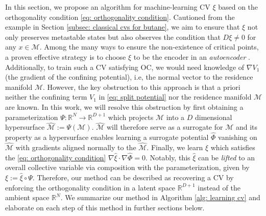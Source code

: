 \documentclass[reqno, 12pt]{article}
\begin{document}
 In this section, we propose an algorithm for machine-learning CV $\xi$ based on the orthogonality condition \eqref{eq: orthogonality condition}. Cautioned from the example in Section \eqref{subsec: classical cvs for butane}, we aim to ensure that $\xi$ not only preserves metastable states but also observes the condition that $D\xi \neq 0$ for any $x \in \mathcal{M}$. Among the many ways to ensure the non-existence of critical points, a proven effective strategy is to choose $\xi$ to be the encoder in an \emph{autoencoder} \cite{belkacemi2023autoencoders}. Additionally, to train such a CV satisfying OC, we would need knowledge of $\nabla V_1$ (the gradient of the confining potential), i.e, the normal vector to the residence manifold $\mathcal{M}$. However, the key obstruction to this approach is that a priori neither the confining term $V_1$ in \eqref{eq: split potential} nor the residence manifold $\mathcal{M}$ are known. In this work, we will resolve this obstruction by first obtaining a parameterization $\Psi: \mathbb{R}^{N} \to \mathbb{R}^{D+1}$ which projects $\mathcal{M}$ into a $D$ dimensional hypersurface $\widehat{\mathcal{M}} := \Psi(\mathcal{M})$. $\widehat{\mathcal{M}}$ will therefore serve as a surrogate for $\mathcal{M}$ and its property as a hypersurface enables learning a surrogate potential $\widehat{\Phi}$ vanishing on $\widehat{\mathcal{M}}$ with gradients aligned normally to the $\widehat{\mathcal{M}}$. Finally, we learn $\widehat{\xi}$ which satisfies the \eqref{eq: orthogonality condition} $\nabla \widehat{\xi} \cdot \nabla \widehat{\Phi} = 0$. Notably, this $\widehat{\xi}$ can be \emph{lifted} to an overall collective variable via composition with the parameterization, given by $\xi := \widehat{\xi} \circ \Psi$. Therefore, our method can be described as recovering a CV by enforcing the orthogonality condition in a latent space $\mathbb{R}^{D+1}$ instead of the ambient space $\mathbb{R}^{N}$. We summarize our method in Algorithm \eqref{alg: learning cv} and elaborate on each step of this method in further sections below. 
\end{document}
